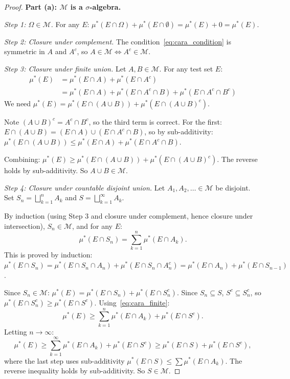 \documentclass[11pt,a4paper]{article}
\theoremstyle{definition}
\theoremstyle{plain}
\theoremstyle{remark}
\begin{document}
\begin{proof}
\textbf{Part (a): $\mathcal{M}$ is a $\sigma$-algebra.}

\textit{Step 1: $\Omega \in \mathcal{M}$.} For any $E$: $\mu^*(E \cap \Omega) + \mu^*(E \cap \emptyset) = \mu^*(E) + 0 = \mu^*(E)$. \checkmark

\textit{Step 2: Closure under complement.} The condition~\eqref{eq:cara_condition} is symmetric in $A$ and $A^c$, so $A \in \mathcal{M} \Leftrightarrow A^c \in \mathcal{M}$. \checkmark

\textit{Step 3: Closure under finite union.} Let $A, B \in \mathcal{M}$. For any test set $E$:
\begin{align}
    \mu^*(E) &= \mu^*(E \cap A) + \mu^*(E \cap A^c) \tag{$A$ measurable}\\
    &= \mu^*(E \cap A) + \mu^*(E \cap A^c \cap B) + \mu^*(E \cap A^c \cap B^c) \tag{$B$ measurable, applied to $E \cap A^c$}
\end{align}
We need $\mu^*(E) = \mu^*(E \cap (A \cup B)) + \mu^*(E \cap (A \cup B)^c)$.

Note $(A \cup B)^c = A^c \cap B^c$, so the third term is correct. For the first:
$E \cap (A \cup B) = (E \cap A) \cup (E \cap A^c \cap B)$, so by sub-additivity:
$\mu^*(E \cap (A \cup B)) \leq \mu^*(E \cap A) + \mu^*(E \cap A^c \cap B)$.

Combining: $\mu^*(E) \geq \mu^*(E \cap (A \cup B)) + \mu^*(E \cap (A \cup B)^c)$.
The reverse holds by sub-additivity. So $A \cup B \in \mathcal{M}$. \checkmark

\textit{Step 4: Closure under countable disjoint union.} Let $A_1, A_2, \ldots \in \mathcal{M}$ be disjoint. Set $S_n = \bigsqcup_{k=1}^n A_k$ and $S = \bigsqcup_{k=1}^\infty A_k$.

By induction (using Step 3 and closure under complement, hence closure under intersection), $S_n \in \mathcal{M}$, and for any $E$:
\begin{equation}
    \mu^*(E \cap S_n) = \sum_{k=1}^n \mu^*(E \cap A_k).
    \label{eq:cara_finite}
\end{equation}
This is proved by induction: $\mu^*(E \cap S_n) = \mu^*(E \cap S_n \cap A_n) + \mu^*(E \cap S_n \cap A_n^c) = \mu^*(E \cap A_n) + \mu^*(E \cap S_{n-1})$.

Since $S_n \in \mathcal{M}$: $\mu^*(E) = \mu^*(E \cap S_n) + \mu^*(E \cap S_n^c)$.
Since $S_n \subseteq S$, $S^c \subseteq S_n^c$, so $\mu^*(E \cap S_n^c) \geq \mu^*(E \cap S^c)$. Using~\eqref{eq:cara_finite}:
\begin{equation}
    \mu^*(E) \geq \sum_{k=1}^n \mu^*(E \cap A_k) + \mu^*(E \cap S^c).
\end{equation}
Letting $n \to \infty$:
\begin{equation}
    \mu^*(E) \geq \sum_{k=1}^\infty \mu^*(E \cap A_k) + \mu^*(E \cap S^c) \geq \mu^*(E \cap S) + \mu^*(E \cap S^c),
\end{equation}
where the last step uses sub-additivity $\mu^*(E \cap S) \leq \sum \mu^*(E \cap A_k)$.
The reverse inequality holds by sub-additivity. So $S \in \mathcal{M}$. \checkmark


\end{proof}
\end{document}
